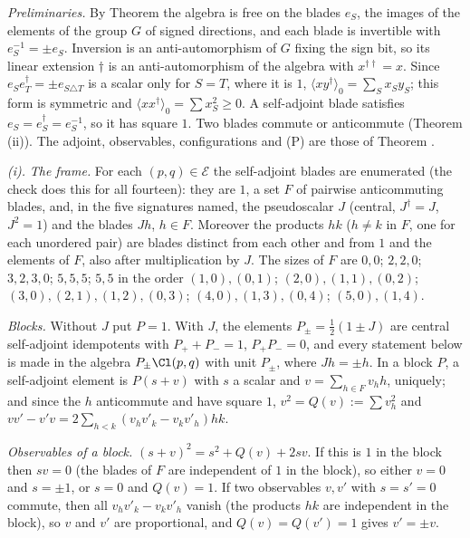 \emph{Preliminaries.} By Theorem  the algebra is free on the blades $e_{S}$, the images of the elements of the group $G$ of signed directions, and each blade is invertible with $e_{S}^{-1} = \pm e_{S}$. Inversion is an anti-automorphism of $G$ fixing the sign bit, so its linear extension $\dagger$ is an anti-automorphism of the algebra with $x^{\dagger\dagger} = x$. Since $e_{S}e_{T}^{\dagger} = \pm e_{S \triangle T}$ is a scalar only for $S = T$, where it is $1$, $\langle xy^{\dagger}\rangle_{0} = \sum_{S}x_{S}y_{S}$; this form is symmetric and $\langle xx^{\dagger}\rangle_{0} = \sum x_{S}^{2} \ge 0$. A self-adjoint blade satisfies $e_{S} = e_{S}^{\dagger} = e_{S}^{-1}$, so it has square $1$. Two blades commute or anticommute (Theorem (ii)). The adjoint, observables, configurations and (P) are those of Theorem .

\emph{(i).} \emph{The frame.} For each $(p,q) \in \mathcal{E}$ the self-adjoint blades are enumerated (the check does this for all fourteen): they are $1$, a set $F$ of pairwise anticommuting blades, and, in the five signatures named, the pseudoscalar $J$ (central, $J^{\dagger} = J$, $J^{2} = 1$) and the blades $Jh$, $h \in F$. Moreover the products $hk$ ($h \ne k$ in $F$, one for each unordered pair) are blades distinct from each other and from $1$ and the elements of $F$, also after multiplication by $J$. The sizes of $F$ are $0, 0$; $2, 2, 0$; $3, 2, 3, 0$; $5, 5, 5$; $5, 5$ in the order $(1,0), (0,1)$; $(2,0), (1,1), (0,2)$; $(3,0), (2,1), (1,2), (0,3)$; $(4,0), (1,3), (0,4)$; $(5,0), (1,4)$.

\emph{Blocks.} Without $J$ put $P = 1$. With $J$, the elements $P_{\pm} = \tfrac12(1 \pm J)$ are central self-adjoint idempotents with $P_{+} + P_{-} = 1$, $P_{+}P_{-} = 0$, and every statement below is made in the algebra $P_{\pm}\Cl(p,q)$ with unit $P_{\pm}$, where $Jh = \pm h$. In a block $P$, a self-adjoint element is $P(s + v)$ with $s$ a scalar and $v = \sum_{h \in F}v_{h}h$, uniquely; and since the $h$ anticommute and have square $1$, $v^{2} = Q(v) := \sum v_{h}^{2}$ and $vv' - v'v = 2\sum_{h < k}(v_{h}v'_{k} - v_{k}v'_{h})hk$.

\emph{Observables of a block.} $(s + v)^{2} = s^{2} + Q(v) + 2sv$. If this is $1$ in the block then $sv = 0$ (the blades of $F$ are independent of $1$ in the block), so either $v = 0$ and $s = \pm 1$, or $s = 0$ and $Q(v) = 1$. If two observables $v, v'$ with $s = s' = 0$ commute, then all $v_{h}v'_{k} - v_{k}v'_{h}$ vanish (the products $hk$ are independent in the block), so $v$ and $v'$ are proportional, and $Q(v) = Q(v') = 1$ gives $v' = \pm v$.

